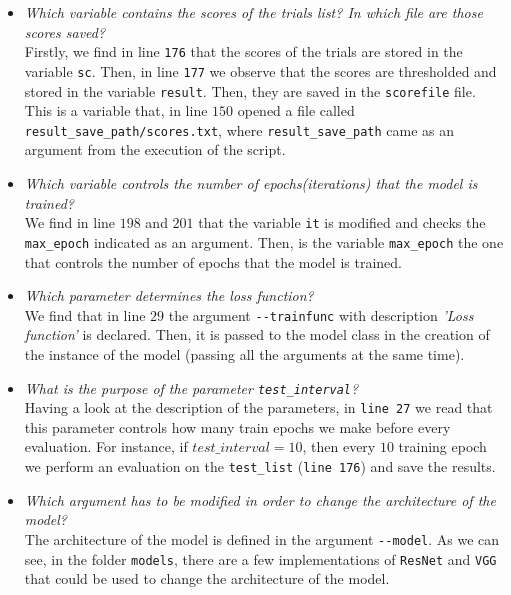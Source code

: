 \documentclass[a4paper]{article}
\def\inline{\lstinline[basicstyle=\ttfamily,keywordstyle={}]}
\begin{document}
\begin{itemize}
  \item \emph{Which variable contains the scores of the trials list? In which file are those scores saved?}\\

        Firstly, we find in line \inline{176} that the scores of the trials are stored in the variable \inline{sc}. Then, in line \inline{177} we observe that the scores are thresholded and stored in the variable \inline{result}. Then, they are saved in the \inline{scorefile} file. This is a variable that, in line \(150\) opened a file called \inline{result_save_path/scores.txt}, where \inline{result_save_path} came as an argument from the execution of the script.

  \item \emph{Which variable controls the number of epochs(iterations) that the model is trained?}\\

        We find in line \(198\) and \(201\) that the variable \inline{it} is modified and checks the \inline{max_epoch} indicated as an argument. Then, is the variable \inline{max_epoch} the one that controls the number of epochs that the model is trained.

  \item \emph{Which parameter determines the loss function?}\\

        We find that in line \(29\) the argument \inline{--trainfunc} with description \emph{'Loss function'} is declared. Then, it is passed to the model class in the creation of the instance of the model (passing all the arguments at the same time).

  \item \emph{What is the purpose of the parameter \inline{test_interval}?}\\

        Having a look at the description of the parameters, in \inline{line 27} we read that this parameter controls how many train epochs we make before every evaluation. For instance, if \(test\_interval = 10\), then every \(10\) training epoch we perform an evaluation on the \inline{test_list} (\inline{line 176}) and save the results.

  \item \emph{Which argument has to be modified in order to change the architecture of the model?}\\


        The architecture of the model is defined in the argument \inline{--model}. As we can see, in the folder \inline{models}, there are a few implementations of \inline{ResNet} and \inline{VGG} that could be used to change the architecture of the model.


\end{itemize}
\end{document}
